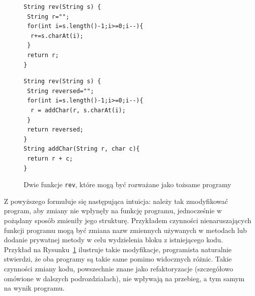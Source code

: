 \begin{figure}[h]
    \centering
    \begin{minipage}[t]{0.45\linewidth}
        \lstset{
            basicstyle=\ttfamily\small,
            frame=single,
            numbers=left,
            numberstyle=\tiny,
            language=Java
        }
        \begin{lstlisting}
String rev(String s) {
 String r="";
 for(int i=s.length()-1;i>=0;i--){
  r+=s.charAt(i);
 }
 return r;
}
        \end{lstlisting}
    \end{minipage}
    \hfill
    \begin{minipage}[t]{0.45\linewidth}
        \lstset{
            basicstyle=\ttfamily\small,
            frame=single,
            numbers=left,
            numberstyle=\tiny,
            language=Java
        }
        \begin{lstlisting}
String rev(String s) {
 String reversed="";
 for(int i=s.length()-1;i>=0;i--){
  r = addChar(r, s.charAt(i);
 }
 return reversed;
}
String addChar(String r, char c){
 return r + c;
}
        \end{lstlisting}
    \end{minipage}
    \caption{Dwie funkcje \texttt{rev}, które mogą być rozważane jako tożsame programy}
    \label{fig:podobny_kod}
\end{figure}

Z powyższego formułuje się następująca intuicja: należy tak zmodyfikować program, aby zmiany nie wpłynęły na funkcję
programu, jednocześnie w pożądany sposób zmieniły jego strukturę.
Przykładem czynności nienaruszających funkcji programu mogą być zmiana nazw zmiennych używanych w metodach lub
dodanie prywatnej metody w celu wydzielenia bloku z istniejącego kodu.
Przykład na Rysunku~\ref{fig:podobny_kod} ilustruje takie modyfikacje, programista naturalnie stwierdzi, że oba
programy są takie same pomimo widocznych różnic.
Takie czynności zmiany kodu, powszechnie znane jako refaktoryzacje (szczegółowo omówione w dalszych podrozdziałach),
nie wpływają na przebieg, a tym samym na wynik programu.

